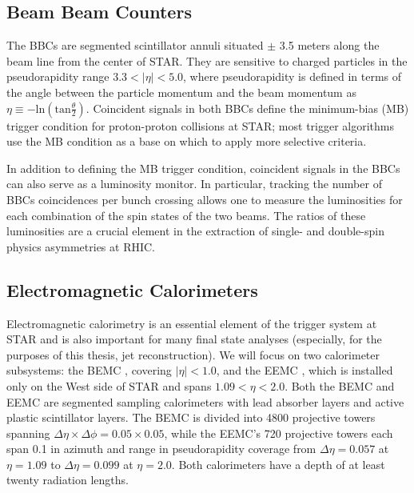 \subsection{Beam Beam Counters}

The BBCs \cite{Kiryluk:2005gg} are segmented scintillator annuli situated $\pm$ 3.5 meters along the beam line from the center of STAR.  They are sensitive to charged particles in the pseudorapidity range $3.3 < |\eta| < 5.0$, where pseudorapidity is defined in terms of the angle between the particle momentum and the beam momentum as $\eta \equiv -\mathrm{ln}\left(\mathrm{tan} \frac{\theta}{2}\right)$.  Coincident signals in both BBCs define the minimum-bias (MB) trigger condition for proton-proton collisions at STAR; most trigger algorithms use the MB condition as a base on which to apply more selective criteria.

In addition to defining the MB trigger condition, coincident signals in the BBCs can also serve as a luminosity monitor.  In particular, tracking the number of BBCs coincidences per bunch crossing allows one to measure the luminosities for each combination of the spin states of the two beams.  The ratios of these luminosities are a crucial element in the extraction of single- and double-spin physics asymmetries at RHIC.

\subsection{Electromagnetic Calorimeters}

Electromagnetic calorimetry is an essential element of the trigger system at STAR and is also important for many final state analyses (especially, for the purposes of this thesis, jet reconstruction).  We will focus on two calorimeter subsystems: the BEMC \cite{Beddo:2002zx}, covering $|\eta| < 1.0$, and the EEMC \cite{Allgower:2002zy}, which is installed only on the West side of STAR and spans $1.09 < \eta < 2.0$.  Both the BEMC and EEMC are segmented sampling calorimeters with lead absorber layers and active plastic scintillator layers.  The BEMC is divided into 4800 projective towers spanning $\Delta \eta \times \Delta \phi = 0.05 \times 0.05$, while the EEMC's 720 projective towers each span 0.1 in azimuth and range in pseudorapidity coverage from $\Delta \eta = 0.057$ at $\eta = 1.09$ to $\Delta \eta = 0.099$ at $\eta = 2.0$.  Both calorimeters have a depth of at least twenty radiation lengths.%

